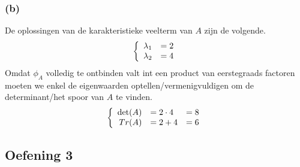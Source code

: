 \documentclass[lineaire_algebra_oplossingen.tex]{subfiles}
\begin{document}
\subsubsection*{(b)}
De oplossingen van de karakteristieke veelterm van $A$ zijn de volgende.
\[
\left\{
\begin{array}{c c}
\lambda_1 &= 2\\
\lambda_2 &= 4\\
\end{array}
\right.
\]
Omdat $\phi_{A}$ volledig te ontbinden valt int een product van eerstegraads factoren moeten we enkel de eigenwaarden optellen/vermenigvuldigen om de determinant/het spoor van $A$ te vinden.
\[
\left\{
\begin{array}{r l l}
\det(A) &= 2\cdot 4 &=  8\\
Tr(A) &= 2+4 &= 6\\
\end{array}
\right.
\]

\subsection{Oefening 3}
\end{document}
